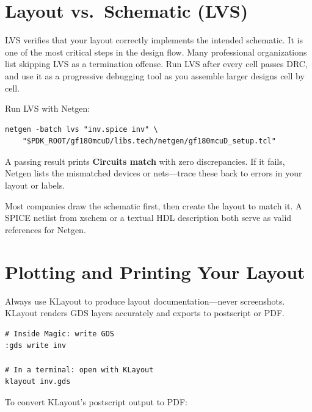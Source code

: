 \documentclass[11pt]{article}
\begin{document}
\section{Layout vs.\ Schematic (LVS)}

LVS verifies that your layout correctly implements the intended
schematic.
It is one of the most critical steps in the design flow.
Many professional organizations list skipping LVS as a termination
offense.
Run LVS after every cell passes DRC, and use it as a progressive
debugging tool as you assemble larger designs cell by cell.

Run LVS with Netgen:

\begin{lstlisting}
netgen -batch lvs "inv.spice inv" \
    "$PDK_ROOT/gf180mcuD/libs.tech/netgen/gf180mcuD_setup.tcl"
\end{lstlisting}

A passing result prints \textbf{Circuits match} with zero
discrepancies.
If it fails, Netgen lists the mismatched devices or nets---trace these
back to errors in your layout or labels.

\begin{tipbox}
Most companies draw the schematic first, then create the layout to
match it.
A SPICE netlist from xschem or a textual HDL description both serve as
valid references for Netgen.
\end{tipbox}

\section{Plotting and Printing Your Layout}

Always use KLayout to produce layout documentation---never screenshots.
KLayout renders GDS layers accurately and exports to postscript or PDF.

\begin{lstlisting}
# Inside Magic: write GDS
:gds write inv

# In a terminal: open with KLayout
klayout inv.gds
\end{lstlisting}

To convert KLayout's postscript output to PDF:
\end{document}
